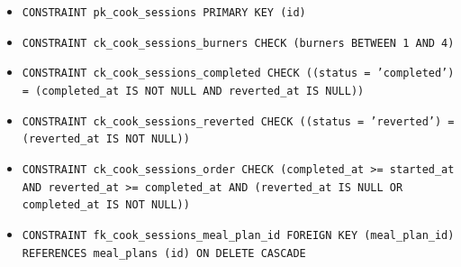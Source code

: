 \begin{itemize}
\item \raggedright {\small\texttt{CONSTRAINT pk\_\allowbreak{}\allowbreak{}cook\_\allowbreak{}\allowbreak{}sessions PRIMARY KEY (id)}}
\item \raggedright {\small\texttt{CONSTRAINT ck\_\allowbreak{}\allowbreak{}cook\_\allowbreak{}\allowbreak{}sessions\_\allowbreak{}\allowbreak{}burners CHECK (burners BETWEEN 1 AND 4)}}
\item \raggedright {\small\texttt{CONSTRAINT ck\_\allowbreak{}\allowbreak{}cook\_\allowbreak{}\allowbreak{}sessions\_\allowbreak{}\allowbreak{}completed CHECK ((status = 'completed') = (completed\_\allowbreak{}\allowbreak{}at IS NOT NULL AND reverted\_\allowbreak{}\allowbreak{}at IS NULL))}}
\item \raggedright {\small\texttt{CONSTRAINT ck\_\allowbreak{}\allowbreak{}cook\_\allowbreak{}\allowbreak{}sessions\_\allowbreak{}\allowbreak{}reverted CHECK ((status = 'reverted') = (reverted\_\allowbreak{}\allowbreak{}at IS NOT NULL))}}
\item \raggedright {\small\texttt{CONSTRAINT ck\_\allowbreak{}\allowbreak{}cook\_\allowbreak{}\allowbreak{}sessions\_\allowbreak{}\allowbreak{}order CHECK (completed\_\allowbreak{}\allowbreak{}at >= started\_\allowbreak{}\allowbreak{}at AND reverted\_\allowbreak{}\allowbreak{}at >= completed\_\allowbreak{}\allowbreak{}at AND (reverted\_\allowbreak{}\allowbreak{}at IS NULL OR completed\_\allowbreak{}\allowbreak{}at IS NOT NULL))}}
\item \raggedright {\small\texttt{CONSTRAINT fk\_\allowbreak{}\allowbreak{}cook\_\allowbreak{}\allowbreak{}sessions\_\allowbreak{}\allowbreak{}meal\_\allowbreak{}\allowbreak{}plan\_\allowbreak{}\allowbreak{}id FOREIGN KEY (meal\_\allowbreak{}\allowbreak{}plan\_\allowbreak{}\allowbreak{}id) REFERENCES meal\_\allowbreak{}\allowbreak{}plans (id) ON DELETE CASCADE}}
\end{itemize}
